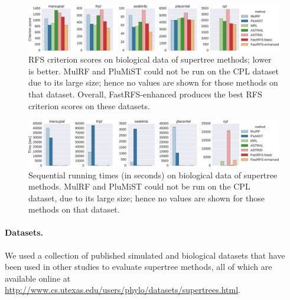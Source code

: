 \begin{figure}
    \centering
    \includegraphics[width=\textwidth]{fastrfs-figs/bio-critscores.eps}
    \caption[Comparison of FastRFS and other supertree methods on five biological datasets with respect to RFS criterion score]{RFS criterion scores on biological data 
of supertree methods; lower is better.
MulRF and PluMiST could not be run on the CPL dataset due to its large size; hence
no values are shown for those methods on that dataset.
Overall, FastRFS-enhanced produces the best RFS criterion scores on these datasets.
}
    \label{fastrfs::fig:bio-critscores}
\end{figure}


 \begin{figure}
     \centering
     \includegraphics[width=\textwidth]{fastrfs-figs/bio-timing.eps}
     \caption[Running times of FastRFS and other supertree methods on five biological datasets]{Sequential running times (in seconds) on biological data of supertree methods. 
 MulRF and PluMiST could not be run on the CPL dataset, due to its large size; hence
 no values are shown for those methods on that dataset.
 }
     \label{fastrfs::fig:bio-timing}
 \end{figure}




\paragraph{\bf Datasets.  }
We used a collection of published simulated and biological datasets that
have been used in other studies \cite{smidgen} to evaluate supertree methods,
all of which are available online at
\url{http://www.cs.utexas.edu/users/phylo/datasets/supertrees.html}.


